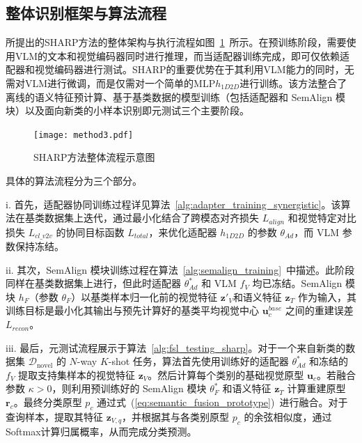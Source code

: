 \subsection{整体识别框架与算法流程} \label{subsec:overall_framework_semantic} 所提出的SHARP方法的整体架构与执行流程如图~\ref{fig:sharp_framework}~所示。在预训练阶段，需要使用VLM的文本和视觉编码器同时进行推理，而当适配器训练完成，即可仅依赖适配器和视觉编码器进行测试。SHARP的重要优势在于其利用VLM能力的同时，无需对VLM进行微调，而是仅需对一个简单的MLP$h_{1D2D}$进行训练。该方法整合了离线的语义特征预计算、基于基类数据的模型训练（包括适配器和 SemAlign 模块）以及面向新类的小样本识别即元测试三个主要阶段。

\begin{figure}[h!] \centering %
\texttt{[image: method3.pdf]}
\caption{SHARP方法整体流程示意图} \label{fig:sharp_framework} %
\end{figure}

具体的算法流程分为三个部分。

i. 首先，适配器协同训练过程详见算法~\ref{alg:adapter_training_synergistic}。该算法在基类数据集上迭代，通过最小化结合了跨模态对齐损失 $L_{align}$ 和视觉特定对比损失 $L_{cl\_v2v}$ 的协同目标函数 $L_{total}$，来优化适配器 $h_{1D2D}$ 的参数 $\theta_{Ad}$，而 VLM 参数保持冻结。

ii. 其次，SemAlign 模块训练过程在算法~\ref{alg:semalign_training}~中描述。此阶段同样在基类数据集上进行，但此时适配器 $\theta_{Ad}^*$ 和 VLM $f_V$ 均已冻结。SemAlign 模块 $h_F$（参数 $\theta_F$）以基类样本归一化前的视觉特征 $\mathbf{z}'_V$和语义特征 $\mathbf{z}_T$ 作为输入，其训练目标是最小化其输出与预先计算好的基类平均视觉中心 $\mathbf{u}_c^{base}$ 之间的重建误差 $L_{recon}$。

iii. 最后，元测试流程展示于算法~\ref{alg:fsl_testing_sharp}。对于一个来自新类的数据集 $\mathcal{D}_{\text{novel}}$ 的 $N$-way $K$-shot 任务，算法首先使用训练好的适配器 $\theta_{Ad}^*$ 和冻结的 $f_V$ 提取支持集样本的视觉特征 $\mathbf{z}_V$。然后计算每个类别的基础视觉原型 $\mathbf{u}_c$。若融合参数 $\kappa > 0$，则利用预训练好的 SemAlign 模块 $\theta_F^*$ 和语义特征 $\mathbf{z}_T$ 计算重建原型 $\mathbf{r}_c$。最终分类原型 $p_c$ 通过式~(\ref{eq:semantic_fusion_prototype})~进行融合。对于查询样本，提取其特征 $\mathbf{z}_{V,q}$，并根据其与各类别原型 $p_c$ 的余弦相似度，通过 Softmax计算归属概率，从而完成分类预测。

